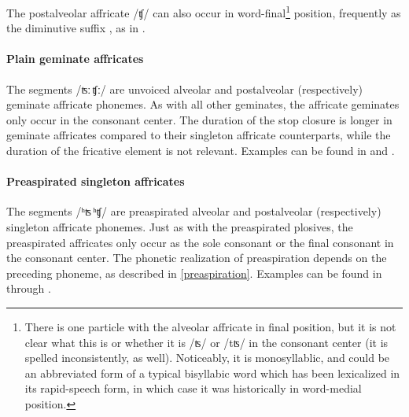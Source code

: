The postalveolar affricate /ʧ/ can also occur in word-final\footnote{There is one particle  with the alveolar affricate in final position, but it is not clear what this is or whether it is /ʦ/ or /tʦ/ in the consonant center (it is spelled inconsistently, as well). Noticeably, it is monosyllablic, and could be an abbreviated form of a typical bisyllabic word which has been lexicalized in its rapid-speech form, in which case it was historically in word-medial position.} %
position, frequently as the diminutive suffix , as in .

\paragraph{Plain geminate affricates}
The segments /ʦː\,ʧː/ are unvoiced alveolar and postalveolar (respectively) geminate affricate phonemes. As with all other geminates, the affricate geminates only occur in the consonant center. The duration of the stop closure is longer in geminate affricates compared to their singleton affricate counterparts, while the duration of the fricative element is not relevant.
Examples can be found in  and .

\paragraph{Preaspirated singleton affricates}
The segments \mbox{/ʰʦ\,ʰʧ/} are preaspirated alveolar and postalveolar (respectively) singleton affricate phonemes. Just as with the preaspirated plosives, the preaspirated affricates only occur as the sole consonant or the final consonant in the consonant center. 
The phonetic realization of preaspiration depends on the preceding phoneme, as described in \SEC\ref{preaspiration}. 
Examples can be found in  through .


